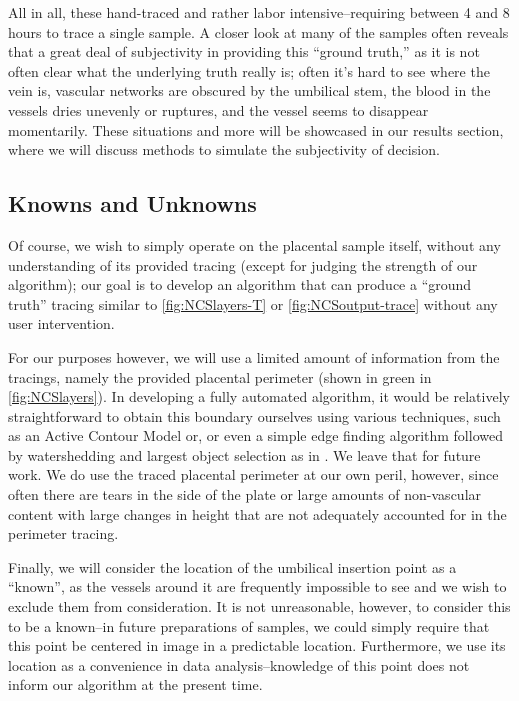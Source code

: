 All in all, these hand-traced and rather labor intensive--requiring between 4 and 8 hours to trace a single sample. A closer look at many of the samples often reveals that a great deal of subjectivity in providing this ``ground truth,'' as it is not often clear what the underlying truth really is; often it's hard to see where the vein is, vascular networks are obscured by the umbilical stem, the blood in the vessels dries unevenly or ruptures, and the vessel seems to disappear momentarily. These situations and more will be showcased in our results section, where we will discuss methods to simulate the subjectivity of decision.


\subsection{Knowns and Unknowns}
Of course, we wish to simply operate on the placental sample itself, without any understanding of its provided tracing (except for judging the strength of our algorithm);
our goal is to develop an algorithm that can produce a ``ground truth'' tracing similar to \cref{fig:NCSlayers-T} or \cref{fig:NCSoutput-trace} without any user intervention.

For our purposes however, we will use a limited amount of information from the tracings, namely the provided placental perimeter (shown in green in \cref{fig:NCSlayers}). In developing a fully automated algorithm, it would be relatively straightforward to obtain this boundary ourselves using various techniques, such as an Active Contour Model \cite{activecontours} or, or even a simple edge finding algorithm followed by watershedding and largest object selection as in \cite{huynh2013filter}. We leave that for future work. We do use the traced placental perimeter at our own peril, however, since often there are tears in the side of the plate or large amounts of non-vascular content with large changes in height that are not adequately accounted for in the perimeter tracing.

Finally, we will consider the location of the umbilical insertion point as a ``known'', as the vessels around it are frequently impossible to see and we wish to exclude them from consideration. It is not unreasonable, however, to consider this to be a known--in future preparations of samples, we could simply require that this point be centered in image in a predictable location. Furthermore, we use its location as a convenience in data analysis--knowledge of this point does not inform our algorithm at the present time.


